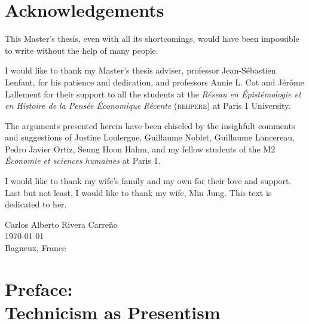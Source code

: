 \documentclass[version=last,draft=false,paper=A4,portrait,twoside=true,twocolumn=false,headinclude=false,footinclude=false,fontsize=12,BCOR=20mm,DIV=calc,pagesize=auto,titlepage=firstiscover,mpinclude=false,open=right,chapterprefix=true,numbers=autoendperiod,headsepline=false,headings=twolinechapter,parskip=false]{scrbook}
\begin{document}
\chapter{Acknowledgements} 
This Master's thesis, even with all its shortcomings, would have been
impossible to write without the help of many people.

I would like to thank my Master's thesis adviser, professor Jean-Sébastien
Lenfant, for his patience and dedication, and professors Annie L. Cot and
Jérôme Lallement for their support to all the students at the
\textit{Réseau en Épistémologie et en Histoire de la Pensée Économique Récente} (\textsc{rehpere}) at Paris 1 University.

The arguments presented herein have been chiseled by the insighfult
comments and suggestions of Justine Loulergue, Guillaume Noblet, Guillaume
Lancereau, Pedro Javier Ortiz, Seung Hoon Hahm, and my fellow students of
the M2 \textit{Économie et sciences humaines} at Paris 1.


I would like to thank my wife's family and my own for their love and
support. Last but not least, I would like to thank my wife, Min Jung. This
text is dedicated to her.

\vspace{2\baselineskip}
\begin{FlushRight}
  Carlos Alberto Rivera Carreño\\
  \today\\
  Bagneux, France
\end{FlushRight}





\chapter[Preface]{Preface:\\ Technicism as Presentism} 
\end{document}
